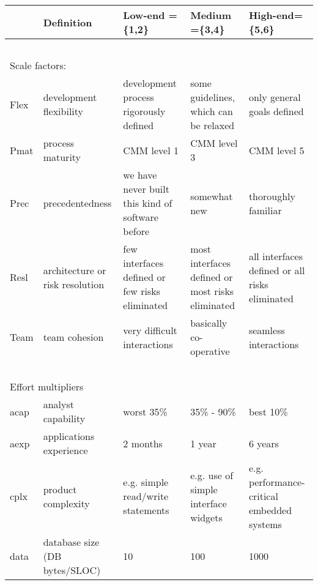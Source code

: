  \begin{figure*}[!t]
{\scriptsize
\begin{center}
\begin{tabular}{|p{0.2in}|p{1.46in}|p{1.5in}|p{1.5in}|p{1.5in}|}\hline

 & Definition & Low-end = \{1,2\}
 &Medium =\{3,4\} &High-end= \{5,6\} \\\hline

\multicolumn{1}{c}{~}\\

\multicolumn{5}{l}{Scale factors:}\\\hline
Flex   &  development flexibility   & development process
rigorously defined & some guidelines, which can be relaxed & only
general goals defined\\\hline

Pmat    & process maturity  &  CMM level 1 &   CMM level 3  &  CMM level 5 \\\hline

Prec & precedentedness  &  we have never built this kind
of software before &    somewhat new &
thoroughly familiar \\\hline

Resl &  architecture or risk resolution  &  few interfaces
defined or few risks eliminated  &  most interfaces defined or most
risks eliminated   & all interfaces defined or all risks
eliminated\\\hline

Team  &   team cohesion  &  very difficult interactions &
basically co-operative  &  seamless interactions\\\hline

\multicolumn{1}{c}{~}\\

\multicolumn{5}{l}{Effort multipliers}\\\hline
acap  &  analyst capability  &  worst 35\% &   35\% - 90\% &  best 10\% \\\hline

aexp   &  applications experience  &  2 months &   1 year  &  6 years\\\hline

cplx   &  product complexity   & e.g. simple read/write
statements & e.g. use of simple interface widgets  &  e.g.
performance-critical embedded systems\\\hline

data   &  database size 
(DB bytes/SLOC) &
10 & 100 &    1000 \\\hline


\end{tabular}
\end{center}}
\end{figure*}

